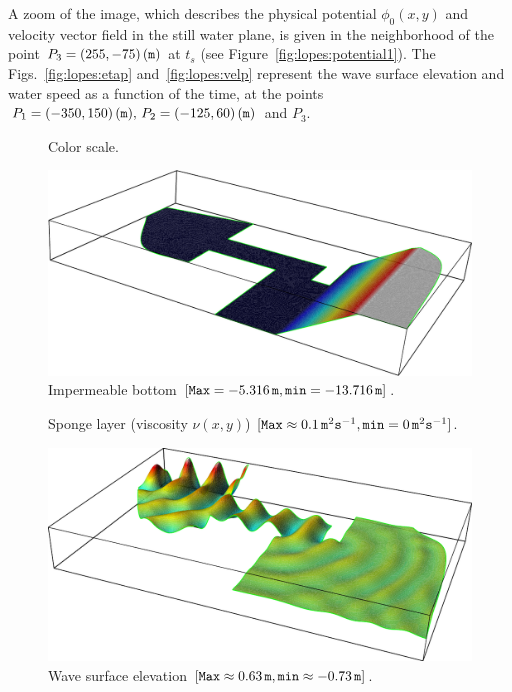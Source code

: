  A zoom of the image, which describes the physical potential
 $\phi_0(x,y)$ and velocity vector field in the still water
 plane, is given in the neighborhood of the point
 $P_3=(255,-75)\,({\tt m})$ at $t_s$ (see
 Figure~\ref{fig:lopes:potential1}).  The
 Figs.~\ref{fig:lopes:etap} and~\ref{fig:lopes:velp}
 represent the wave surface elevation and water speed as a
 function of the time, at the points $P_1=(-350, 150)\,({\tt
   m}),\, P_2=(-125,60)\,({\tt m})$ and $P_3$.
\begin{figure}
\begin{center}
\end{center}
\caption{Color scale.}
\label{fig:lopes:scale}
\end{figure}

\begin{figure}
\begin{center}
\includegraphics[width=\largefig]{chapters/lopes/pdf/depth.pdf}
\end{center}
\caption{Impermeable bottom $[{\tt Max}=-5.316\,{\tt m},{\tt
      min}=-13.716\,{\tt m}]$.}
\label{fig:lopes:harbor_depth}
\end{figure}
\begin{figure}
\begin{center}
\end{center}
\caption{Sponge layer (viscosity $\nu(x,y)$) $[{\tt Max}
    \approx 0.1\,{\tt m}^2{\tt s}^{-1}, {\tt min}=0 \,{\tt
      m}^2{\tt s}^{-1}]$.}
\label{fig:lopes:sponge}
\end{figure}
\begin{figure}
\begin{center}
\includegraphics[width=\largefig]{chapters/lopes/pdf/eta.pdf}
\end{center}
\caption{Wave surface elevation $[{\tt Max}\approx 0.63\,{\tt m},
    {\tt min}\approx-0.73\,{\tt m}] $.}
\label{fig:lopes:elevation}
\end{figure}
